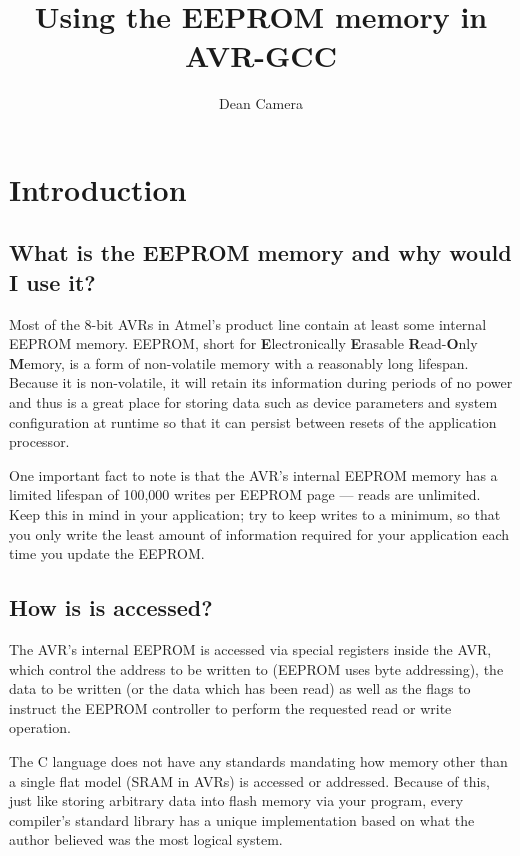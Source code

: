 \documentclass[a4paper,oneside,notitlepage]{book}
\begin{document}
\title{Using the EEPROM memory in AVR-GCC}
\author{Dean Camera}

\maketitle

\tableofcontents
\cleardoublepage


\chapter{Introduction}

\section{What is the EEPROM memory and why would I use it?}

Most of the 8-bit AVRs in Atmel's product line contain at least some internal EEPROM memory. EEPROM, short for \textbf{E}lectronically \textbf{E}rasable \textbf{R}ead-\textbf{O}nly \textbf{M}emory, is a form of non-volatile memory with a reasonably long lifespan. Because it is non-volatile, it will retain its information during periods of no power and thus is a great place for storing data such as device parameters and system configuration at runtime so that it can persist between resets of the application processor.

One important fact to note is that the AVR's internal EEPROM memory has a limited lifespan of 100,000 writes per EEPROM page --- reads are unlimited. Keep this in mind in your application; try to keep writes to a minimum, so that you only write the least amount of information required for your application each time you update the EEPROM.

\section{How is is accessed?}

The AVR's internal EEPROM is accessed via special registers inside the AVR, which control the address to be written to (EEPROM uses byte addressing), the data to be written (or the data which has been read) as well as the flags to instruct the EEPROM controller to perform the requested read or write operation.

The C language does not have any standards mandating how memory other than a single flat model (SRAM in AVRs) is accessed or addressed. Because of this, just like storing arbitrary data into flash memory via your program, every compiler's standard library has a unique implementation based on what the author believed was the most logical system.
\end{document}
